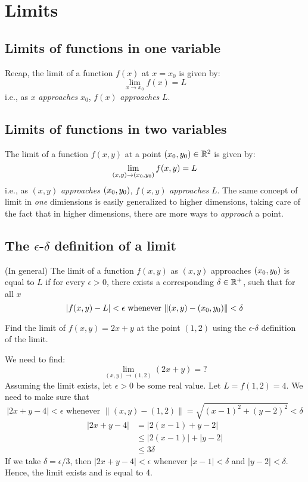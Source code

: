 \section{Limits}

\subsection{Limits of functions in one variable}
Recap, the limit of a function $f(x)$ at $x = x_0$ is given by:
\begin{equation}
    \lim_{x \to x_0} f(x) = L
\end{equation}
i.e., as $x$ \textit{approaches} $x_0$, $f(x)$ \textit{approaches} $L$.


\subsection{Limits of functions in two variables}
The limit of a function $f(x, y)$ at a point $(x_0, y_0) \in \mathbb{R}^2$ is given by:
\begin{equation}
    \lim_{(x, y) \to (x_0, y_0)} f(x, y) = L
\end{equation}
i.e., as $(x, y)$ \textit{approaches} $(x_0, y_0)$, $f(x, y)$ \textit{approaches} $L$. The same concept of limit
in \textit{one} dimiensions is easily generalized to higher dimensions, taking care of the fact that in higher
dimensions, there are more ways to \textit{approach} a point.


\subsection{The \texorpdfstring{$\epsilon$-$\delta$}{e-d} definition of a limit}
(In general) The limit of a function $f(x, y)$ as $(x, y)$ approaches $(x_0, y_0)$ is equal to $L$ if for every $\epsilon > 0$,
there exists a corresponding $\delta \in \mathbb{R}^+$, such that for all $x$
\begin{equation}
    |f(x, y) - L| < \epsilon \text{ whenever } \lVert (x, y) - (x_0, y_0) \rVert < \delta
\end{equation}

\begin{example}
    \normalfont Find the limit of $f(x, y) = 2x + y$ at the point $(1, 2)$ using the $\epsilon$-$\delta$
    definition of the limit.

    We need to find:
    $$\lim_{(x, y) \to (1, 2)} (2x + y) = ?$$
    Assuming the limit exists, let $\epsilon > 0$ be some real value. Let $L = f(1, 2) = 4$. We need to make sure that
    $$|2x + y - 4| < \epsilon \text{ whenever } \lVert(x, y) - (1, 2) \rVert = \sqrt{(x-1)^2 + (y-2)^2} < \delta$$
    \begin{align*}
        |2x + y - 4| &= |2 (x-1) + y - 2| \\
        &\leq |2 (x-1)| + |y - 2| \\
        &\leq 3 \delta
    \end{align*}
    If we take $\delta = \epsilon/3$, then $|2x + y - 4| < \epsilon$ whenever $|x - 1| < \delta$ and $|y - 2| < \delta$.
    Hence, the limit exists and is equal to 4.
\end{example}



